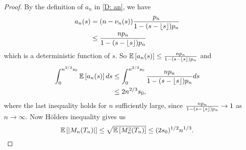 \begin{proof}
	By the definition of $a_n$ in \eqref{D: an}, we have
	\begin{equation}
	\begin{aligned}
	a_n(s) &= (n - \nu_n(s)) \frac{p_n}{1 - (s - \lfloor s\rfloor)p_n} \\
	&\leq \frac{n p_n}{1 - (s - \lfloor s\rfloor)p_n}
	\end{aligned}
	\end{equation}
	which is a deterministic function of $s$. So
	$ \mathbb{E} \left[ a_n(s) \right] \leq \frac{n p_n}{1 - (s - \lfloor s\rfloor)p_n} $
	and
	\begin{equation}
	\begin{aligned}
	\int_{0}^{n^{2 / 3}s_0} \mathbb{E} \left[ a_n(s) \right] ds 
	&\leq \int_{0}^{n^{2 / 3}s_0}\frac{n p_n}{1 - (s - \lfloor s\rfloor)p_n}ds \\
	&\leq 2n^{2 / 3}s_0,
	\end{aligned}
	\end{equation}
	where the last inequality holds for $n$ sufficiently large, since 
	$\frac{n p_n}{1 - (s - \lfloor s\rfloor)p_n} \rightarrow 1$
	as $n \rightarrow \infty$.
	Now Hölders inequality gives us
	\begin{equation} \label{E: Exp(Mn)}
	\mathbb{E} \left[ |M_n(T_n)| \right] \leq \sqrt{\mathbb{E} \left[ M^2_n(T_n) \right]} \leq (2s_0)^{1/2}n^{1 / 3}.
	\end{equation}
	

\end{proof}
